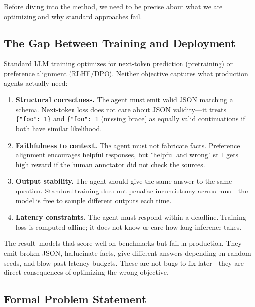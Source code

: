 \documentclass[11pt]{article}
\begin{document}
Before diving into the method, we need to be precise about what we are optimizing and why standard approaches fail.

\subsection{The Gap Between Training and Deployment}

Standard LLM training optimizes for next-token prediction (pretraining) or preference alignment (RLHF/DPO).
Neither objective captures what production agents actually need:

\begin{enumerate}[leftmargin=12pt]
    \item \textbf{Structural correctness.} The agent must emit valid JSON matching a schema. Next-token loss does not care about JSON validity---it treats \texttt{\{"foo": 1\}} and \texttt{\{"foo": 1} (missing brace) as equally valid continuations if both have similar likelihood.

    \item \textbf{Faithfulness to context.} The agent must not fabricate facts. Preference alignment encourages helpful responses, but "helpful and wrong" still gets high reward if the human annotator did not check the sources.

    \item \textbf{Output stability.} The agent should give the same answer to the same question. Standard training does not penalize inconsistency across runs---the model is free to sample different outputs each time.

    \item \textbf{Latency constraints.} The agent must respond within a deadline. Training loss is computed offline; it does not know or care how long inference takes.
\end{enumerate}

The result: models that score well on benchmarks but fail in production.
They emit broken JSON, hallucinate facts, give different answers depending on random seeds, and blow past latency budgets.
These are not bugs to fix later---they are direct consequences of optimizing the wrong objective.

\subsection{Formal Problem Statement}
\end{document}
